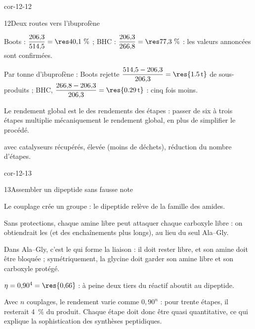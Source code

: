 \begin{blocLivre}{cor-12-12}
\begin{corrige}{12}{Deux routes vers l'ibuprofène}
\begin{questions}
\item Boots : $\dfrac{206{,}3}{514{,}5}=\res{40{,}1~\%}$ ; BHC : $\dfrac{206{,}3}{266{,}8}=\res{77{,}3~\%}$ :
les valeurs annoncées sont confirmées.
\item Par tonne d'ibuprofène : Boots rejette $\dfrac{514{,}5-206{,}3}{206{,}3}=\res{\qty{1,5}{t}}$ de sous-produits ;
BHC, $\dfrac{266{,}8-206{,}3}{206{,}3}=\res{\qty{0,29}{t}}$ : cinq fois moins.
\item Le rendement global est le  des rendements des étapes : passer de six à trois étapes
multiplie mécaniquement le rendement global, en plus de simplifier le procédé.
\item {} avec catalyseurs récupérés,  élevée (moins de déchets),
réduction du nombre d'étapes.
\end{questions}
\end{corrige}
\end{blocLivre}
\begin{blocLivre}{cor-12-13}
\begin{corrige}{13}{Assembler un dipeptide sans fausse note}
\begin{questions}
\item Le couplage crée un groupe   : le dipeptide relève de la famille des amides.
\item Sans protections, chaque amine libre peut attaquer chaque carboxyle libre : on obtiendrait les
 (et des enchaînements plus longs), au lieu du seul Ala--Gly.
\item Dans Ala--Gly, c'est le  qui forme la liaison : il doit rester libre, et son
amine doit être bloquée ; symétriquement, la glycine doit garder son amine libre et son carboxyle protégé.
\item $\eta=0{,}90^4=\res{0{,}66}$ : à peine deux tiers du réactif aboutit au dipeptide.
\item Avec $n$ couplages, le rendement varie comme $0{,}90^n$ : pour trente étapes, il resterait 4~\% du produit.
Chaque étape doit donc être quasi quantitative, ce qui explique la sophistication des synthèses peptidiques.
\end{questions}
\end{corrige}
\end{blocLivre}
